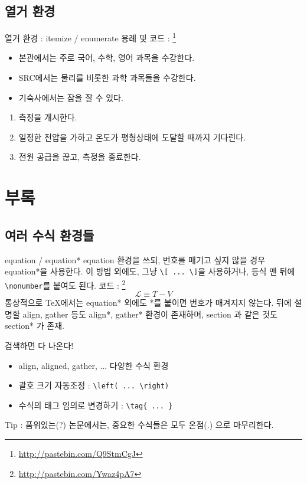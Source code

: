 \documentclass[12pt]{beamer}
\begin{document}
\subsection{열거 환경}
\begin{frame}{열거 환경 : itemize / enumerate}
	용례 및 코드 : \footnote{\url{http://pastebin.com/Q9StmCgJ}}
	\begin{itemize}
		\item 본관에서는 주로 국어, 수학, 영어 과목을 수강한다.
		\item SRC에서는 물리를 비롯한 과학 과목들을 수강한다.
		\item 기숙사에서는 잠을 잘 수 있다.
	\end{itemize}
	\begin{enumerate}
		\item 측정을 개시한다.
		\item 일정한 전압을 가하고 온도가 평형상태에 도달할 때까지 기다린다.
		\item 전원 공급을 끊고, 측정을 종료한다.
	\end{enumerate}
\end{frame}
\section{부록}
\subsection{여러 수식 환경들}
\begin{frame}[fragile]{equation / equation*}
	equation 환경을 쓰되, 번호를 매기고 싶지 않을 경우 equation*을 
	사용한다. 
	이 방법 외에도, 그냥 \verb|\[ ... \]|을 사용하거나,
	등식 맨 뒤에 \verb|\nonumber|를 붙여도 된다. 코드 : 
	\footnote{\url{http://pastebin.com/Ywaz4pA7}}
	\begin{equation*}
		\mathcal{L} \equiv T-V
	\end{equation*}
	통상적으로 \TeX 에서는 equation* 외에도 *를 붙이면 번호가 매겨지지 않는다. 뒤에 설명할 align, gather 등도 align*, gather* 환경이 존재하며, section 과 같은 것도 section* 가 존재.
\end{frame}
\begin{frame}[fragile]{검색하면 다 나온다!}
	\begin{itemize}
		\item align, aligned, gather, ... 다양한 수식 환경
		\item 괄호 크기 자동조정 : \verb|\left( ... \right)|
		\item 수식의 태그 임의로 변경하기 : \verb|\tag{ ... }|
	\end{itemize}
	Tip : 품위있는(?) 논문에서는, 중요한 수식들은 모두 온점(.) 으로 마무리한다.
\end{frame}
\end{document}
